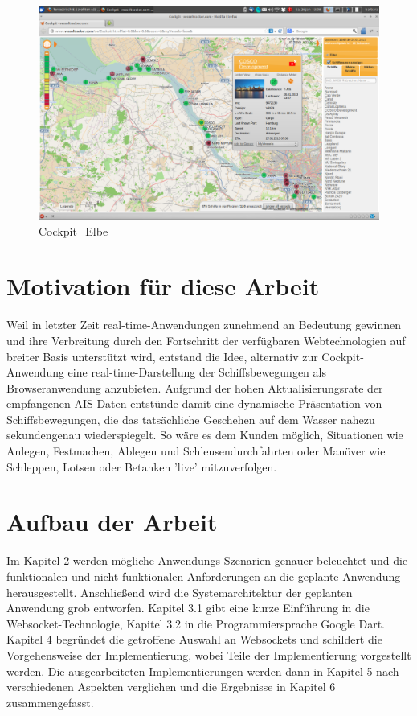 \begin{figure}[H]
  \centering
  \includegraphics[width=6in]{images/Cockpit_Elbe}
  \caption[Cockpit\_Elbe]{Cockpit\_Elbe}
\end{figure}

\section{Motivation für diese Arbeit}\label{s.Motivation für diese Arbeit}

Weil in letzter Zeit real-time-Anwendungen zunehmend an Bedeutung gewinnen und ihre Verbreitung durch den Fortschritt der verfügbaren Webtechnologien auf breiter Basis unterstützt wird, entstand die Idee, alternativ zur Cockpit-Anwendung eine real-time-Darstellung der Schiffsbewegungen als Browseranwendung anzubieten. Aufgrund der hohen Aktualisierungsrate der empfangenen AIS-Daten entstünde damit eine dynamische Präsentation von Schiffsbewegungen, die das tatsächliche Geschehen auf dem Wasser nahezu sekundengenau wiederspiegelt. So wäre es dem Kunden möglich, Situationen wie Anlegen, Festmachen, Ablegen und Schleusendurchfahrten oder Manöver wie Schleppen, Lotsen oder Betanken 'live' mitzuverfolgen.

\section{Aufbau der Arbeit}\label{s.Aufbau der Arbeit}
Im Kapitel 2 werden mögliche Anwendungs-Szenarien genauer beleuchtet und die funktionalen und nicht funktionalen Anforderungen an die geplante Anwendung herausgestellt. Anschließend wird die Systemarchitektur der geplanten Anwendung grob entworfen.
Kapitel 3.1 gibt eine kurze Einführung in die Websocket-Technologie, Kapitel 3.2 in die Programmiersprache Google Dart.
Kapitel 4 begründet die getroffene Auswahl an Websockets und schildert die Vorgehensweise der Implementierung, wobei Teile der Implementierung vorgestellt werden.
Die ausgearbeiteten Implementierungen werden dann in Kapitel 5 nach verschiedenen Aspekten verglichen und die Ergebnisse in Kapitel 6 zusammengefasst.

